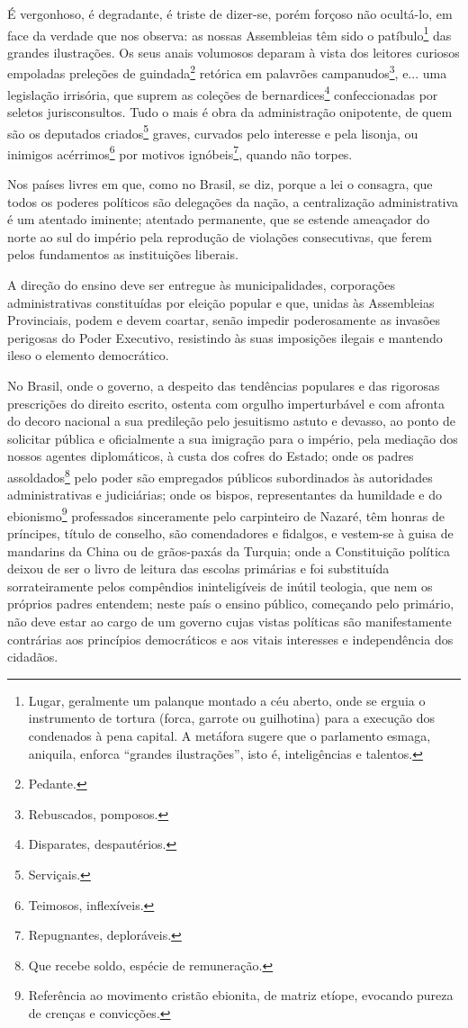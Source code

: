 É vergonhoso, é degradante, é triste de dizer-se, porém forçoso não
ocultá-lo, em face da verdade que nos observa: as nossas Assembleias têm
sido o patíbulo\footnote{Lugar, geralmente um palanque montado a céu
  aberto, onde se erguia o instrumento de tortura (forca, garrote ou
  guilhotina) para a execução dos condenados à pena capital. A metáfora
  sugere que o parlamento esmaga, aniquila, enforca ``grandes
  ilustrações'', isto é, inteligências e talentos.} das grandes
ilustrações. Os seus anais volumosos deparam à vista dos leitores
curiosos empoladas preleções de guindada\footnote{Pedante.} retórica
em palavrões campanudos\footnote{Rebuscados, pomposos.}, e... uma
legislação irrisória, que suprem as coleções de bernardices\footnote{
  Disparates, despautérios.} confeccionadas por seletos jurisconsultos.
Tudo o mais é obra da administração onipotente, de quem são os deputados
criados\footnote{Serviçais.} graves, curvados pelo interesse e pela
lisonja, ou inimigos acérrimos\footnote{Teimosos, inflexíveis.} por
motivos ignóbeis\footnote{Repugnantes, deploráveis.}, quando não
torpes.

Nos países livres em que, como no Brasil, se diz, porque a lei o
consagra, que todos os poderes políticos são delegações da nação, a
centralização administrativa é um atentado iminente; atentado
permanente, que se estende ameaçador do norte ao sul do império pela
reprodução de violações consecutivas, que ferem pelos fundamentos as
instituições liberais.

A direção do ensino deve ser entregue às municipalidades, corporações
administrativas constituídas por eleição popular e que, unidas às
Assembleias Provinciais, podem e devem coartar, senão impedir
poderosamente as invasões perigosas do Poder Executivo, resistindo às
suas imposições ilegais e mantendo ileso o elemento democrático.

No Brasil, onde o governo, a despeito das tendências populares e das
rigorosas prescrições do direito escrito, ostenta com orgulho
imperturbável e com afronta do decoro nacional a sua predileção pelo
jesuitismo astuto e devasso, ao ponto de solicitar pública e
oficialmente a sua imigração para o império, pela mediação dos nossos
agentes diplomáticos, à custa dos cofres do Estado; onde os padres
assoldados\footnote{Que recebe soldo, espécie de remuneração.} pelo
poder são empregados públicos subordinados às autoridades
administrativas e judiciárias; onde os bispos, representantes da
humildade e do ebionismo\footnote{Referência ao movimento cristão
  ebionita, de matriz etíope, evocando pureza de crenças e convicções.}
professados sinceramente pelo carpinteiro de Nazaré, têm honras de
príncipes, título de conselho, são comendadores e fidalgos, e vestem-se
à guisa de mandarins da China ou de grãos-paxás da Turquia; onde a
Constituição política deixou de ser o livro de leitura das escolas
primárias e foi substituída sorrateiramente pelos compêndios
ininteligíveis de inútil teologia, que nem os próprios padres entendem;
neste país o ensino público, começando pelo primário, não deve estar ao
cargo de um governo cujas vistas políticas são manifestamente contrárias
aos princípios democráticos e aos vitais interesses e independência dos
cidadãos.

